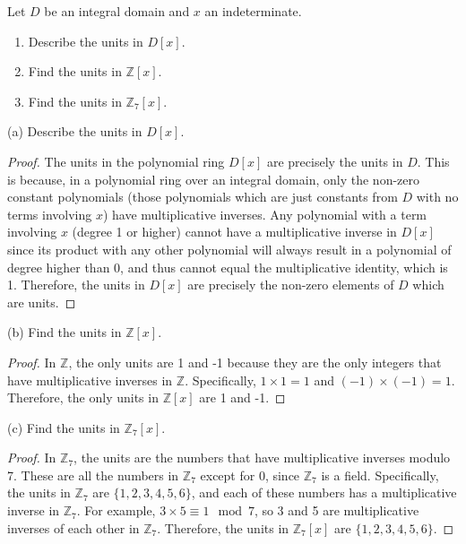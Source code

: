 \documentclass[12pt]{amsart}
\theoremstyle{definition}
\numberwithin{equation}{section}
\theoremstyle{plain}
\newcommand{\Z}{\mathbb{Z}}
\begin{document}
\vspace*{20pt}
\begin{exercise}{25} Let $D$ be an integral domain and $x$ an indeterminate.
  \begin{enumerate}[label=(\alph*.)]
    \item Describe the units in $D[x]$.
    \item Find the units in $\Z[x]$.
    \item Find the units in $\Z_7[x]$.
  \end{enumerate}



(a) Describe the units in \( D[x] \).

\begin{proof}
The units in the polynomial ring \( D[x] \) are precisely the units in \( D \). This is because, in a polynomial ring over an integral domain, only the non-zero constant polynomials (those polynomials which are just constants from \( D \) with no terms involving \( x \)) have multiplicative inverses. Any polynomial with a term involving \( x \) (degree 1 or higher) cannot have a multiplicative inverse in \( D[x] \) since its product with any other polynomial will always result in a polynomial of degree higher than 0, and thus cannot equal the multiplicative identity, which is 1. Therefore, the units in \( D[x] \) are precisely the non-zero elements of \( D \) which are units.
\end{proof}

(b) Find the units in \( \Z[x] \).

\begin{proof}
In \( \Z \), the only units are 1 and -1 because they are the only integers that have multiplicative inverses in \( \Z \). Specifically, \( 1 \times 1 = 1 \) and \( (-1) \times (-1) = 1 \). Therefore, the only units in \( \Z[x] \) are 1 and -1.
\end{proof}

(c) Find the units in \( \Z_7[x] \).

\begin{proof}
In \( \Z_7 \), the units are the numbers that have multiplicative inverses modulo 7. These are all the numbers in \( \Z_7 \) except for 0, since \( \Z_7 \) is a field. Specifically, the units in \( \Z_7 \) are \( \{1, 2, 3, 4, 5, 6\} \), and each of these numbers has a multiplicative inverse in \( \Z_7 \). For example, \( 3 \times 5 \equiv 1 \mod 7 \), so 3 and 5 are multiplicative inverses of each other in \( \Z_7 \). Therefore, the units in \( \Z_7[x] \) are \( \{1, 2, 3, 4, 5, 6\} \).
\end{proof}
    
\end{exercise}
\end{document}
